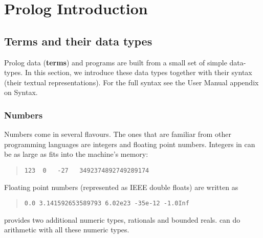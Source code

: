 %
% 
% 
% 
% 

\chapter{Prolog Introduction}


\section{Terms and their data types}
 
Prolog data ({\bf terms}) and programs are built from a small set of
simple data-types.  In this section, we introduce these data types
together with their syntax (their textual representations).  For the
full syntax see the User Manual appendix on Syntax.




\subsection{Numbers}
 
Numbers come in several flavours. The ones that are familiar from
other programming languages are integers and floating point numbers.
Integers in {\eclipse} can be as large as fits into the machine's
memory:
\begin{quote}\begin{verbatim}
123  0   -27   3492374892749289174
\end{verbatim}\end{quote}
 
Floating point numbers (represented as IEEE double floats) are written
as
\begin{quote}\begin{verbatim}
0.0 3.141592653589793 6.02e23 -35e-12 -1.0Inf
\end{verbatim}\end{quote}
   
{\eclipse} provides two additional numeric types, rationals and
bounded reals.  {\eclipse} can do arithmetic with all these numeric
types.

